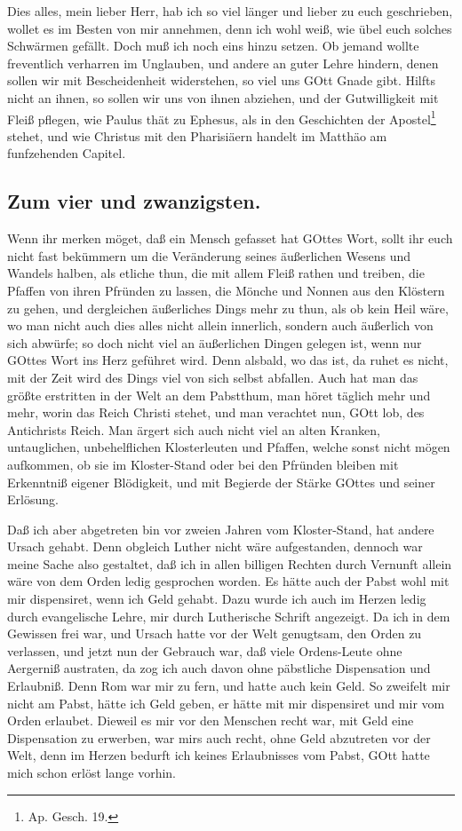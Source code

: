 Dies alles, mein lieber Herr, hab ich so viel länger und lieber zu euch geschrieben, wollet es im Besten von mir annehmen, denn ich wohl weiß, wie übel euch solches Schwärmen gefällt. Doch muß ich noch eins hinzu setzen. Ob jemand wollte freventlich verharren im Unglauben, und andere an guter Lehre hindern, denen sollen wir mit Bescheidenheit widerstehen, so viel uns GOtt Gnade gibt. Hilfts nicht an ihnen, so sollen wir uns von ihnen abziehen, und der Gutwilligkeit mit Fleiß pflegen, wie Paulus thät zu Ephesus, als in den Geschichten der Apostel\footnote{Ap. Gesch. 19.} stehet, und wie Christus mit den Pharisiäern handelt im Matthäo am funfzehenden Capitel.

\subsection*{Zum vier und zwanzigsten.}

Wenn ihr merken möget, daß ein Mensch gefasset hat GOttes Wort, sollt ihr euch nicht fast bekümmern um die Veränderung seines äußerlichen Wesens und Wandels halben, als etliche thun, die mit allem Fleiß rathen und treiben, die Pfaffen von ihren Pfründen zu lassen, die Mönche und Nonnen aus den Klöstern zu gehen, und dergleichen äußerliches Dings mehr zu thun, als ob kein Heil wäre, wo man nicht auch dies alles nicht allein innerlich, sondern auch äußerlich von sich abwürfe; so doch nicht viel an äußerlichen Dingen gelegen ist, wenn nur GOttes Wort ins Herz geführet wird. Denn alsbald, wo das ist, da ruhet es nicht, mit der Zeit wird des Dings viel von sich selbst abfallen. Auch hat man das größte erstritten in der Welt an dem Pabstthum, man höret täglich mehr und mehr, worin das Reich Christi stehet, und man verachtet nun, GOtt lob, des Antichrists Reich. Man ärgert sich auch nicht viel an alten Kranken, untauglichen, unbehelflichen Klosterleuten und Pfaffen, welche sonst nicht mögen
aufkommen, ob sie im Kloster-Stand oder bei den Pfründen bleiben mit Erkenntniß eigener Blödigkeit, und mit Begierde der Stärke GOttes und seiner Erlösung.

Daß ich aber abgetreten bin vor zweien Jahren vom Kloster-Stand, hat andere Ursach gehabt. Denn obgleich Luther nicht wäre aufgestanden, dennoch war meine Sache also gestaltet, daß ich in allen billigen Rechten durch Vernunft allein wäre von dem Orden ledig gesprochen worden. Es hätte auch der Pabst wohl mit mir dispensiret, wenn ich Geld gehabt. Dazu wurde ich auch im Herzen ledig durch evangelische Lehre, mir durch Lutherische Schrift angezeigt. Da ich in dem Gewissen frei war, und Ursach hatte vor der Welt genugtsam, den Orden zu verlassen, und jetzt nun der Gebrauch war, daß viele Ordens-Leute ohne Aergerniß austraten, da zog ich auch davon ohne päbstliche Dispensation und Erlaubniß. Denn Rom war mir zu fern, und hatte auch kein Geld. So zweifelt mir nicht am Pabst, hätte ich Geld geben, er hätte mit mir dispensiret und mir vom Orden erlaubet. Dieweil es mir vor den Menschen recht war, mit Geld eine Dispensation zu erwerben, war mirs auch recht, ohne Geld abzutreten vor der Welt, denn im Herzen bedurft ich keines Erlaubnisses vom Pabst, GOtt hatte mich schon erlöst lange vorhin.


